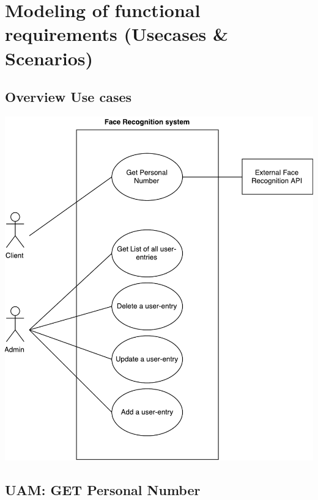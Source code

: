 \documentclass[a4paper,11pt]{article}
\begin{document}
\newpage
\section{Modeling of functional requirements (Usecases \& Scenarios)}
\subsection{Overview Use cases}
\vspace{1.6cm}
\includegraphics[scale=0.9]{images/UserCaseDiagram.pdf}

\subsection{UAM: GET Personal Number}
\end{document}
